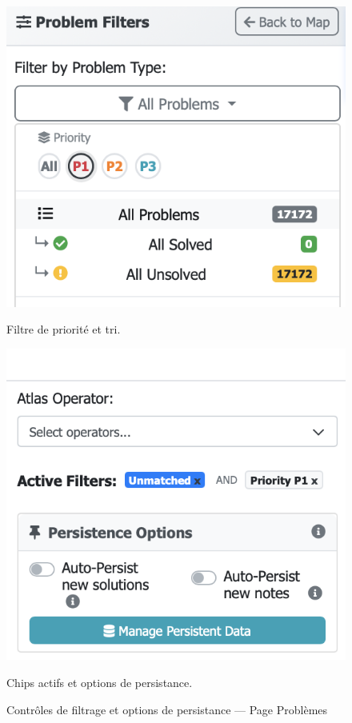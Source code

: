 \begin{figure}[h]
  \centering
  \begin{minipage}[b]{0.48\textwidth}
    \centering
    \includegraphics[width=\textwidth]{../figures/chap9/problems priority filter.png}
    \caption*{Filtre de priorité et tri.}
  \end{minipage}\hfill
  \begin{minipage}[b]{0.48\textwidth}
    \centering
    \includegraphics[width=\textwidth]{../figures/chap9/problems fiterchips and persistence options toggles.png}
    \caption*{Chips actifs et options de persistance.}
  \end{minipage}
  \caption[Contrôles — Page Problèmes]{Contrôles de filtrage et options de persistance — Page Problèmes}
\end{figure}

